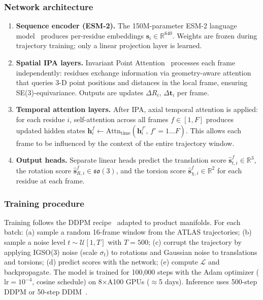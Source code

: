 \documentclass[12pt,letterpaper]{article}
\begin{document}
\subsubsection*{Network architecture}
\begin{enumerate}
\item \textbf{Sequence encoder (ESM-2).} The 150M-parameter ESM-2 language model~\cite{lin2023evolutionary} produces per-residue embeddings $\mathbf{s}_i \in \mathbb{R}^{640}$. Weights are frozen during trajectory training; only a linear projection layer is learned.
\item \textbf{Spatial IPA layers.} Invariant Point Attention~\cite{jumper2021alphafold} processes each frame independently: residues exchange information via geometry-aware attention that queries 3-D point positions and distances in the local frame, ensuring SE(3)-equivariance. Outputs are updates $\Delta R_i$, $\Delta\mathbf{t}_i$ per frame.
\item \textbf{Temporal attention layers.} After IPA, axial temporal attention is applied: for each residue $i$, self-attention across all frames $f\in[1,F]$ produces updated hidden states $\mathbf{h}_i^f \leftarrow \text{Attn}_\text{time}(\mathbf{h}_i^{f'},\,f'=1\ldots F)$. This allows each frame to be influenced by the context of the entire trajectory window.
\item \textbf{Output heads.} Separate linear heads predict the translation score $\hat{\mathbf{s}}_{t,i}^f \in \mathbb{R}^3$, the rotation score $\hat{\mathbf{s}}_{R,i}^f \in \mathfrak{so}(3)$, and the torsion score $\hat{\mathbf{s}}_{\chi,i}^f \in \mathbb{R}^2$ for each residue at each frame.
\end{enumerate}

\subsubsection*{Training procedure}
Training follows the DDPM recipe~\cite{ho2020ddpm} adapted to product manifolds. For each batch: (a) sample a random 16-frame window from the ATLAS trajectories; (b) sample a noise level $t \sim \mathcal{U}[1,T]$ with $T=500$; (c) corrupt the trajectory by applying IGSO(3) noise (scale $\sigma_t$) to rotations and Gaussian noise to translations and torsions; (d) predict scores with the network; (e) compute $\mathcal{L}$ and backpropagate. The model is trained for 100,000 steps with the Adam optimizer ($\text{lr}=10^{-4}$, cosine schedule) on 8$\times$A100 GPUs ($\approx$5 days). Inference uses 500-step DDPM or 50-step DDIM~\cite{song2020ddim}.
\end{document}

